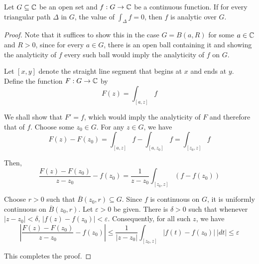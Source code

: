 \begin{theorem}[Morera]
    Let $G\subseteq\mathbb{C}$ be an open set and $f: G\to\mathbb{C}$ be a continuous function. If for every triangular path $\Delta$ in $G$, the value of $\int_\Delta f = 0$, then $f$ is analytic over $G$.
\end{theorem}
\begin{proof}
    Note that it suffices to show this in the case $G = B(a,R)$ for some $a\in\mathbb{C}$ and $R > 0$, since for every $a\in G$, there is an open ball containing it and showing the analyticity of $f$ every such ball would imply the analyticity of $f$ on $G$.

    Let $[x,y]$ denote the straight line segment that begins at $x$ and ends at $y$. Define the function $F: G\to\mathbb{C}$ by 
    \begin{equation*}
        F(z) = \int_{[a,z]} f
    \end{equation*}

    We shall show that $F' = f$, which would imply the analyticity of $F$ and therefore that of $f$. Choose some $z_0\in G$. For any $z\in G$, we have 
    \begin{equation*}
        F(z) - F(z_0) = \int_{[a,z]}f - \int_{[a,z_0]}f = \int_{[z_0, z]}f
    \end{equation*}

    Then, 
    \begin{equation*}
        \frac{F(z) - F(z_0)}{z - z_0} - f(z_0) = \frac{1}{z - z_0}\int_{[z_0, z]} \left(f - f(z_0)\right)
    \end{equation*}

    Choose $r > 0$ such that $\overline B(z_0, r)\subseteq G$. Since $f$ is continuous on $G$, it is uniformly continuous on $\overline B(z_0, r)$. Let $\varepsilon > 0$ be given. There is $\delta > 0$ such that whenever $|z - z_0| < \delta$, $|f(z) - f(z_0)| < \varepsilon$. Consequently, for all such $z$, we have 
    \begin{equation*}
        \left|\frac{F(z) - F(z_0)}{z - z_0} - f(z_0)\right|\le\frac{1}{|z - z_0|}\int_{[z_0,z]}\left|f(t) - f(z_0)\right|~|dt|\le\varepsilon
    \end{equation*}

    This completes the proof.
\end{proof}

